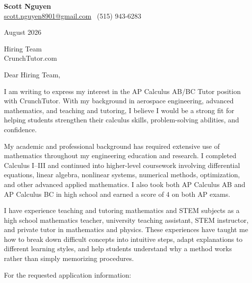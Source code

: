 \documentclass[11pt]{article}
\begin{document}
	
	\begin{center}
		{\Large\bfseries\color{mygreen} Scott Nguyen}\\[4pt]
		\href{mailto:scott.nguyen8901@gmail.com}{scott.nguyen8901@gmail.com} \textbar\ (515) 943-6283
	\end{center}
	
	\vspace{0.2in}
	
	August 2026
	
	Hiring Team \\
	CrunchTutor.com
	
	\vspace{0.1in}
	
	Dear Hiring Team,
	
	I am writing to express my interest in the AP Calculus AB/BC Tutor position with CrunchTutor. With my background in aerospace engineering, advanced mathematics, and teaching and tutoring, I believe I would be a strong fit for helping students strengthen their calculus skills, problem-solving abilities, and confidence.
	
	My academic and professional background has required extensive use of mathematics throughout my engineering education and research. I completed Calculus I--III and continued into higher-level coursework involving differential equations, linear algebra, nonlinear systems, numerical methods, optimization, and other advanced applied mathematics. I also took both AP Calculus AB and AP Calculus BC in high school and earned a score of 4 on both AP exams.
	
	I have experience teaching and tutoring mathematics and STEM subjects as a high school mathematics teacher, university teaching assistant, STEM instructor, and private tutor in mathematics and physics. These experiences have taught me how to break down difficult concepts into intuitive steps, adapt explanations to different learning styles, and help students understand why a method works rather than simply memorizing procedures.
	
	For the requested application information:
	
\end{document}
